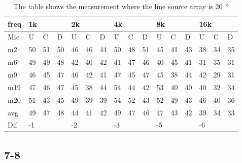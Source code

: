 \begin{table}[H]
\centering
\caption{The table shows the measurement where the line source array is \SI{20}{\degree}}
\begin{tabular}{l|l|l|l|l|l|l|l|l|l|l|l|l|lll}
freq & \multicolumn{3}{l|}{1k} & \multicolumn{3}{l|}{2k} & \multicolumn{3}{l|}{4k} & \multicolumn{3}{l|}{8k} & \multicolumn{3}{l}{16k}                                \\ \hline
Mic  & U      & C      & D     & U      & C      & D     & U      & C      & D     & U      & C      & D     & \multicolumn{1}{l|}{U}  & \multicolumn{1}{l|}{C}  & D  \\ \hline
m2    & 50     &  51    &  50    &  46    &  46    &  44    &  50    &   48    &  51    &  45     &  41    &  43    & \multicolumn{1}{l|}{38} & \multicolumn{1}{l|}{34} & 35  \\
m6    & 49     &  49    &  48    & 42     &  40    &  42    &   41   &   47    &   46   &   40    &  45    &  41    & \multicolumn{1}{l|}{31} & \multicolumn{1}{l|}{35} & 31  \\
m9    &  46    &  45    & 47     &  40    &   42   &   41   &   47   &   45    &  47    &   45    &  38   &  44    & \multicolumn{1}{l|}{42} & \multicolumn{1}{l|}{29} & 31 \\
m19  &    47  &  46    &  47    &  45    &  38    &    44  &   54   &   44    &   42   &   53    &  40   &   40   & \multicolumn{1}{l|}{40} & \multicolumn{1}{l|}{32} & 34 \\
m20  & 51     &  43    &  45    &  49    &  39    &    39  &   54   &   52    &   43   &  52     &  49    &   43   & \multicolumn{1}{l|}{46} & \multicolumn{1}{l|}{40} &  36\\ \hline
avg & 49     &  47    &  48    &  44    &  41    &   42   &  49    &  47     & 46     &  47     &  43    &   42   & \multicolumn{1}{l|}{39} & \multicolumn{1}{l|}{34}  &33  \\ \hline  
Dif & \multicolumn{3}{l|}{-1} & \multicolumn{3}{l|}{-2} & \multicolumn{3}{l|}{-3} & \multicolumn{3}{l|}{-5} & \multicolumn{3}{l}{-6}                                
\end{tabular}
\end{table}


\subsection{7-8}

